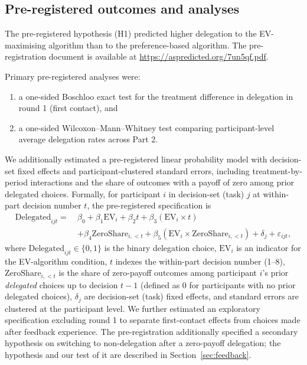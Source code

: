 \documentclass[a4paper, 12pt, fleqn]{article}
\theoremstyle{hypstyle}
\begin{document}
\subsection{Pre-registered outcomes and analyses}
The pre-registered hypothesis (H1) predicted higher delegation to the EV-maximising algorithm than to the preference-based algorithm.
The pre-registration document is available at {\footnotesize\url{https://aspredicted.org/7un5qf.pdf}}.

Primary pre-registered analyses were:
\begin{enumerate}
  \item a one-sided Boschloo exact test for the treatment difference in delegation in round 1 (first contact), and
  \item a one-sided Wilcoxon--Mann--Whitney test comparing participant-level average delegation rates across Part 2.
\end{enumerate}

We additionally estimated a pre-registered linear probability model with decision-set fixed effects and participant-clustered standard errors, including treatment-by-period interactions and the share of outcomes with a payoff of zero among prior delegated choices. Formally, for participant $i$ in decision-set (task) $j$ at within-part decision number $t$, the pre-registered specification is
\begin{equation}
\begin{split}
\mathrm{Delegated}_{ijt} = \ & \beta_0 + \beta_1 \mathrm{EV}_i + \beta_2 t + \beta_3 (\mathrm{EV}_i \times t) \\
& + \beta_4 \mathrm{ZeroShare}_{i,<t} + \beta_5 (\mathrm{EV}_i \times \mathrm{ZeroShare}_{i,<t}) + \delta_j + \varepsilon_{ijt},
\end{split}
\end{equation}
where $\mathrm{Delegated}_{ijt} \in \{0,1\}$ is the binary delegation choice, $\mathrm{EV}_i$ is an indicator for the EV-algorithm condition, $t$ indexes the within-part decision number (1--8), $\mathrm{ZeroShare}_{i,<t}$ is the share of zero-payoff outcomes among participant $i$'s prior \emph{delegated} choices up to decision $t-1$ (defined as 0 for participants with no prior delegated choices), $\delta_j$ are decision-set (task) fixed effects, and standard errors are clustered at the participant level. We further estimated an exploratory specification excluding round 1 to separate first-contact effects from choices made after feedback experience. The pre-registration additionally specified a secondary hypothesis on switching to non-delegation after a zero-payoff delegation; the hypothesis and our test of it are described in Section~\ref{sec:feedback}.
\end{document}
